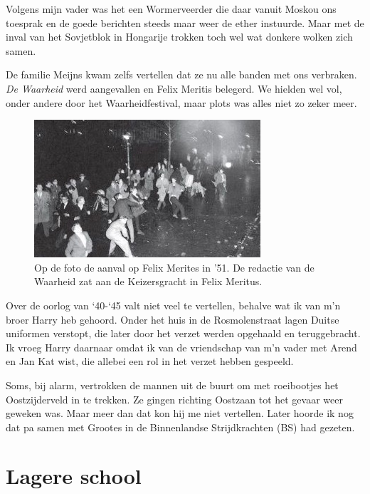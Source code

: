 \documentclass[10pt,twoside, openright]{memoir}
\begin{document}
Volgens mijn vader was het een Wormerveerder die daar vanuit Moskou ons toesprak en de goede berichten steeds maar weer de ether instuurde. Maar met de inval van het Sovjetblok in Hongarije trokken toch wel wat donkere wolken zich samen. 

De familie Meijns kwam zelfs vertellen dat ze nu alle banden met ons verbraken. \emph{De Waarheid} werd aangevallen en Felix Meritis belegerd. We hielden wel vol, onder andere door het Waarheidfestival, maar plots was alles niet zo zeker meer.

\begin{figure}
\includegraphics[width=\textwidth]{img/ch17/Felix_Meritis1}
\caption*{\footnotesize Op de foto de aanval op Felix Merites in ’51. De redactie van de Waarheid zat aan de Keizersgracht in Felix Meritus.}
\end{figure}

Over de oorlog van `40-`45 valt niet veel te vertellen, behalve wat ik van m’n broer Harry heb gehoord. Onder het huis in de Rosmolenstraat lagen Duitse uniformen verstopt, die later door het verzet werden opgehaald en teruggebracht. Ik vroeg Harry daarnaar omdat ik van de vriendschap van m’n vader met Arend en Jan Kat wist, die allebei een rol in het verzet hebben gespeeld. 

Soms, bij alarm, vertrokken de mannen uit de buurt om met roeibootjes het Oostzijderveld in te trekken. Ze gingen richting Oostzaan tot het gevaar weer geweken was. Maar meer dan dat kon hij me niet vertellen. Later hoorde ik nog dat pa samen met Grootes in de Binnenlandse Strijdkrachten (BS) had gezeten.

\section{Lagere school} %
\label{cha:lagere_school}
\end{document}
